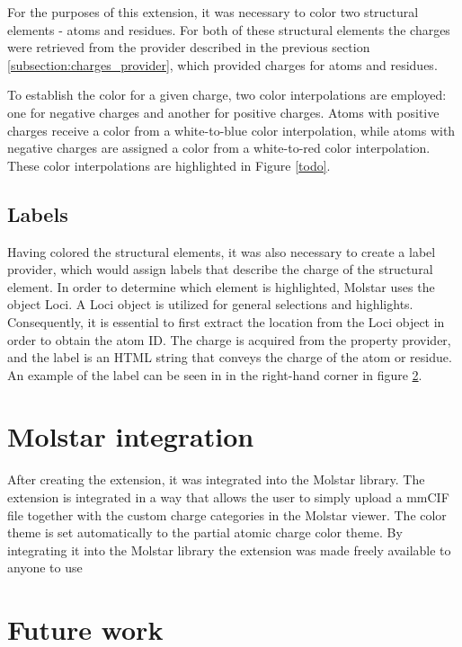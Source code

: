 \documentclass[
  digital,     %
  oneside,     %
  nosansbold,  %
  nocolorbold, %
  lof,         %
  lot,         %
]{fithesis4}
\begin{document}
For the purposes of this extension, it was necessary to color two structural elements - atoms and residues. For both of these structural elements the charges were retrieved from the provider described in the previous section \ref{subsection:charges_provider}, which provided charges for atoms and residues.

To establish the color for a given charge, two color interpolations are employed: one for negative charges and another for positive charges. Atoms with positive charges receive a color from a white-to-blue color interpolation, while atoms with negative charges are assigned a color from a white-to-red color interpolation. These color interpolations are highlighted in Figure \ref{todo}. 

\subsection{Labels}

Having colored the structural elements, it was also necessary to create a label provider, which would assign labels that describe the charge of the structural element. In order to determine which element is highlighted, Molstar uses the object Loci. A Loci object is utilized for general selections and highlights. Consequently, it is essential to first extract the location from the Loci object in order to obtain the atom ID. The charge is acquired from the property provider, and the label is an HTML string that conveys the charge of the atom or residue. An example of the label can be seen in in the right-hand corner in figure \ref{}.

\section{Molstar integration}

After creating the extension, it was integrated into the Molstar library. The extension is integrated in a way that allows the user to simply upload a mmCIF file together with the custom charge categories in the Molstar viewer. The color theme is set automatically to the partial atomic charge color theme. By integrating it into the Molstar library the extension was made freely available to anyone to use

\section{Future work}
\end{document}
